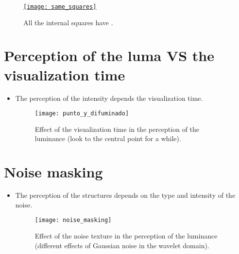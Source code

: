 \begin{figure}[H]
  \centering
  \href{https://github.com/vicente-gonzalez-ruiz/medical_imaging/blob/main/notebooks/same_squares.ipynb}{\texttt{[image: same\_squares]}}
  \caption[Lightness VS surrounding luminance (2).]{All the internal squares have .}
  \label{fig:squares}
\end{figure}

\section{Perception of the luma VS the visualization time}
\begin{itemize}
\item The perception of the intensity depends the visualization time.
\begin{figure}[H]
  \vspace{-0ex}
  \centering
  \texttt{[image: punto\_y\_difuminado]}
  \caption[Effect of visualization time in the perception of the luminance.]{Effect of the visualization time in the perception of the luminance (look to the central point for a while).}
  \label{fig:luminance_vs_visualization_time}
\end{figure}
\end{itemize}

\section{Noise masking}
\begin{itemize}
\item The perception of the structures depends on the type and intensity of the noise.
\begin{figure}[H]
  \centering
  \texttt{[image: noise\_masking]}
  \caption[Noise masking effect.]{Effect of the noise texture in the perception of the luminance (different effects of Gaussian noise in the wavelet domain).}
  \label{fig:noise_masking}
\end{figure}
\end{itemize}
